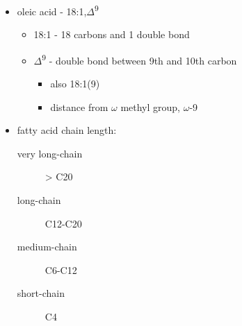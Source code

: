 \documentclass[12pt]{scrartcl}
\begin{document}
\begin{itemize}
\item oleic acid - 18:1,\(\Delta\)\textsuperscript{9}
\begin{itemize}
\item 18:1 - 18 carbons and 1 double bond
\item \(\Delta\)\textsuperscript{9} - double bond between 9th and 10th carbon
\begin{itemize}
\item also 18:1(9)
\item distance from \(\omega\) methyl group, \(\omega\)-9
\end{itemize}
\end{itemize}

\item fatty acid chain length:
\begin{description}
\item[{very long-chain}] > C20
\item[{long-chain}] C12-C20
\item[{medium-chain}] C6-C12
\item[{short-chain}] C4
\end{description}
\end{itemize}
\end{document}
